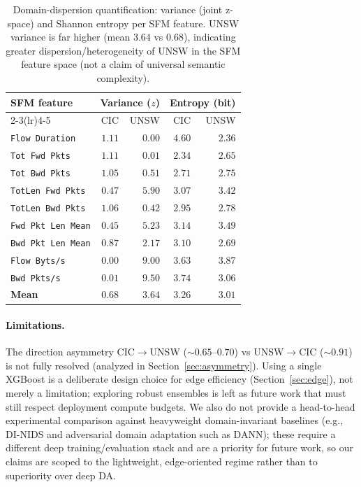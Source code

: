 \documentclass[preprint,12pt,authoryear]{elsarticle}
\begin{document}
\begin{table}[h]
\centering
\caption{Domain-dispersion quantification: variance (joint z-space) and Shannon
entropy per SFM feature. UNSW variance is far higher (mean $3.64$ vs $0.68$),
indicating greater dispersion/heterogeneity of UNSW in the SFM feature space (not a
claim of universal semantic complexity).}
\label{tab:complexity}
\small
\begin{tabular}{lrrrr}
\toprule
\multirow{2}{*}{SFM feature} & \multicolumn{2}{c}{Variance ($z$)} & \multicolumn{2}{c}{Entropy (bit)} \\
\cmidrule(lr){2-3}\cmidrule(lr){4-5}
 & CIC & UNSW & CIC & UNSW \\
\midrule
\texttt{Flow Duration}    & $1.11$ & $0.00$ & $4.60$ & $2.36$ \\
\texttt{Tot Fwd Pkts}     & $1.11$ & $0.01$ & $2.34$ & $2.65$ \\
\texttt{Tot Bwd Pkts}     & $1.05$ & $0.51$ & $2.71$ & $2.75$ \\
\texttt{TotLen Fwd Pkts}  & $0.47$ & $5.90$ & $3.07$ & $3.42$ \\
\texttt{TotLen Bwd Pkts}  & $1.06$ & $0.42$ & $2.95$ & $2.78$ \\
\texttt{Fwd Pkt Len Mean} & $0.45$ & $5.23$ & $3.14$ & $3.49$ \\
\texttt{Bwd Pkt Len Mean} & $0.87$ & $2.17$ & $3.10$ & $2.69$ \\
\texttt{Flow Byts/s}      & $0.00$ & $9.00$ & $3.63$ & $3.87$ \\
\texttt{Bwd Pkts/s}       & $0.01$ & $9.50$ & $3.74$ & $3.06$ \\
\midrule
\textbf{Mean}             & $\mathbf{0.68}$ & $\mathbf{3.64}$ & $3.26$ & $3.01$ \\
\bottomrule
\end{tabular}
\end{table}

\paragraph{Limitations.} The direction asymmetry CIC$\rightarrow$UNSW
($\sim 0.65$--$0.70$) vs UNSW$\rightarrow$CIC ($\sim 0.91$) is not fully resolved
(analyzed in Section~\ref{sec:asymmetry}). Using a single XGBoost is a deliberate
design choice for edge efficiency (Section~\ref{sec:edge}), not merely a
limitation; exploring robust ensembles is left as future work that must still
respect deployment compute budgets. We also do not provide a head-to-head
experimental comparison against heavyweight domain-invariant baselines
(e.g., DI-NIDS \citep{layeghy} and adversarial domain adaptation such as DANN);
these require a different deep training/evaluation stack and are a priority for
future work, so our claims are scoped to the lightweight, edge-oriented regime
rather than to superiority over deep DA.
\end{document}
